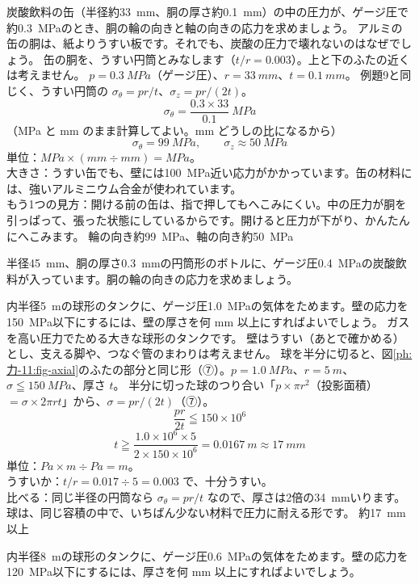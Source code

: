 \begin{phreidai}[炭酸飲料の缶]
\label{ph:力-11:ex10}炭酸飲料の缶（半径約\qty{33}{mm}、胴の厚さ約\qty{0.1}{mm}）の中の圧力が、ゲージ圧で約\qty{0.3}{MPa}のとき、胴の輪の向きと軸の向きの応力を求めましょう。
\phbamen
アルミの缶の胴は、紙よりうすい板です。それでも、炭酸の圧力で壊れないのはなぜでしょう。
\phmushi
缶の胴を、うすい円筒とみなします（$t/r=0.003$）。上と下のふたの近くは考えません。
\phzu
$p=\qty{0.3}{MPa}$（ゲージ圧）、$r=\qty{33}{mm}$、$t=\qty{0.1}{mm}$。
\phriyu
例題9と同じく、うすい円筒の $\sigma_\theta=pr/t$、$\sigma_z=pr/(2t)$。
\phtateru
\[ \sigma_\theta=\frac{0.3\times33}{0.1}\ \unit{MPa} \]
（MPa と mm のまま計算してよい。mm どうしの比になるから）
\phtoku
\[ \sigma_\theta=\qty{99}{MPa},\qquad \sigma_z\approx\qty{50}{MPa} \]
\phtashikame
単位：$\unit{MPa}\times(\unit{mm}\div\unit{mm})=\unit{MPa}$。\\
大きさ：うすい缶でも、壁には\qty{100}{MPa}近い応力がかかっています。缶の材料には、強いアルミニウム合金が使われています。\\
もう1つの見方：開ける前の缶は、指で押してもへこみにくい。中の圧力が胴を引っぱって、張った状態にしているからです。開けると圧力が下がり、かんたんにへこみます。
\kotae 輪の向き約\qty{99}{MPa}、軸の向き約\qty{50}{MPa}
\end{phreidai}
\begin{jibun}
半径\qty{45}{mm}、胴の厚さ\qty{0.3}{mm}の円筒形のボトルに、ゲージ圧\qty{0.4}{MPa}の炭酸飲料が入っています。胴の輪の向きの応力を求めましょう。
\end{jibun}

\begin{phreidai}[球形のタンクの壁の厚さ]
\label{ph:力-11:ex11}内半径\qty{5}{m}の球形のタンクに、ゲージ圧\qty{1.0}{MPa}の気体をためます。壁の応力を\qty{150}{MPa}以下にするには、壁の厚さを何 mm 以上にすればよいでしょう。
\phbamen
ガスを高い圧力でためる大きな球形のタンクです。
\phmushi
壁はうすい（あとで確かめる）とし、支える脚や、つなぐ管のまわりは考えません。
\phzu
球を半分に切ると、図\ref{ph:力-11:fig-axial}のふたの部分と同じ形（⑦）。$p=\qty{1.0}{MPa}$、$r=\qty{5}{m}$、$\sigma\leqq\qty{150}{MPa}$、厚さ $t$。
\phriyu
半分に切った球のつり合い「$p\times\pi r^2$（投影面積）$=\sigma\times2\pi rt$」から、$\sigma=pr/(2t)$（⑦）。
\phtateru
\[ \frac{pr}{2t}\leqq150\times10^6 \]
\phtoku
\[ t\geqq\frac{1.0\times10^6\times5}{2\times150\times10^6}=\qty{0.0167}{m}\approx\qty{17}{mm} \]
\phtashikame
単位：$\unit{Pa}\times\unit{m}\div\unit{Pa}=\unit{m}$。\\
うすいか：$t/r=0.017\div5=0.003$ で、十分うすい。\\
比べる：同じ半径の円筒なら $\sigma_\theta=pr/t$ なので、厚さは2倍の\qty{34}{mm}いります。球は、同じ容積の中で、いちばん少ない材料で圧力に耐える形です。
\kotae 約\qty{17}{mm}以上
\end{phreidai}
\begin{jibun}
内半径\qty{8}{m}の球形のタンクに、ゲージ圧\qty{0.6}{MPa}の気体をためます。壁の応力を\qty{120}{MPa}以下にするには、厚さを何 mm 以上にすればよいでしょう。
\end{jibun}

